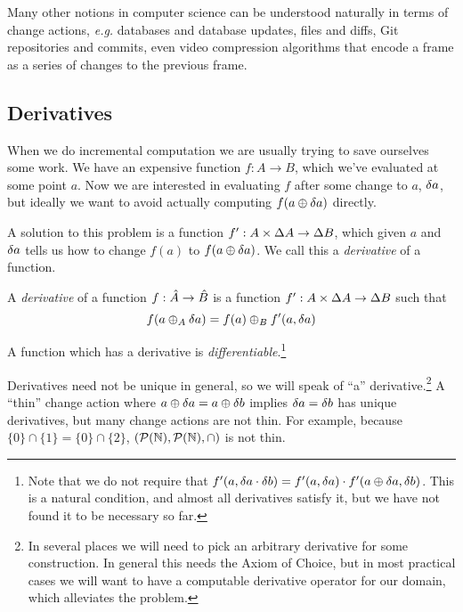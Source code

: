 Many other notions in computer science can be understood naturally in terms of change actions,
\emph{e.g.} databases and database updates, files and diffs, Git repositories and commits, even 
video compression algorithms that encode a frame as a series of changes to the previous frame.

\subsection{Derivatives}

When we do incremental computation we are usually trying to save ourselves some
work. We have an expensive function $f: A \rightarrow B$, which we've evaluated at some point
$a$. Now we are interested in evaluating $f$ after some change to $a$,
$\delta a$, but ideally we want to avoid actually computing $f(a \oplus
\delta a)$ directly.

A solution to this problem is a function $f': A \times \Delta A
\rightarrow \Delta B$, which given $a$ and $\delta a$ tells us how to change
$f(a)$ to $f(a \oplus \delta a)$. We call this a \emph{derivative} of a function.

\begin{defn}[Derivatives]
  \label{def:derivative}
  A \emph{derivative} of a function $f: \hat{A} \rightarrow \hat{B}$ is a function $f': A \times \Delta A \rightarrow
  \Delta B$ such that
  \begin{displaymath}
    f(a \oplus_A \delta a) = f(a) \oplus_B f'(a, \delta a)
  \end{displaymath}

  A function which has a derivative is 
  \emph{differentiable}.\footnote{Note that we do not require that $f'(a,
    \delta a \cdot \delta b) = f'(a, \delta a) \cdot f'(a
    \oplus \delta a, \delta b)$. This is a natural condition, and almost all
    derivatives satisfy it, but we have not found it to be necessary so far.}
\end{defn}

Derivatives need not be unique in general, so we will speak of ``a''
derivative.\footnote{In several places we will need to pick an arbitrary
  derivative for some construction. In general this needs the Axiom of Choice,
  but in most practical cases we will want to have a computable derivative
  operator for our domain, which alleviates the problem.} A ``thin'' change
action \textemdash{} where $a \oplus \delta a = a \oplus \delta b$ implies $\delta a =
\delta b$ \textemdash{} has unique derivatives, but many change actions are not thin.
For example, because $\{0\} \cap \{1\} = \{0\}
\cap \{2\}$, $(\mathcal{P}(\mathbb{N}),\mathcal{P}(\mathbb{N}),\cap)$ is not thin.

